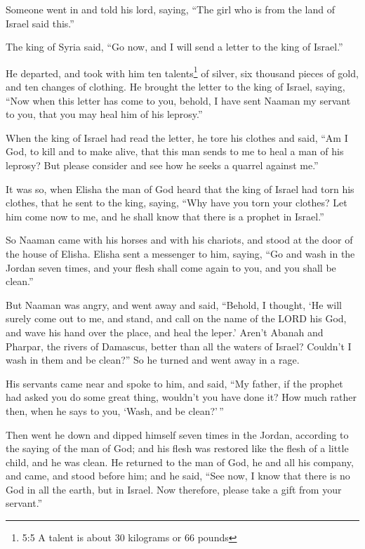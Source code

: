  Someone went in and told his lord, saying, ``The girl who
is from the land of Israel said this.''

 The king of Syria said, ``Go now, and I will send a letter
to the king of Israel.''

He departed, and took with him ten talents\footnote{5:5 A talent is
  about 30 kilograms or 66 pounds} of silver, six thousand pieces of
gold, and ten changes of clothing.  He brought the letter to
the king of Israel, saying, ``Now when this letter has come to you,
behold, I have sent Naaman my servant to you, that you may heal him of
his leprosy.''

 When the king of Israel had read the letter, he tore his
clothes and said, ``Am I God, to kill and to make alive, that this man
sends to me to heal a man of his leprosy? But please consider and see
how he seeks a quarrel against me.''

 It was so, when Elisha the man of God heard that the king
of Israel had torn his clothes, that he sent to the king, saying, ``Why
have you torn your clothes? Let him come now to me, and he shall know
that there is a prophet in Israel.''

 So Naaman came with his horses and with his chariots, and
stood at the door of the house of Elisha.  Elisha sent a
messenger to him, saying, ``Go and wash in the Jordan seven times, and
your flesh shall come again to you, and you shall be clean.''

 But Naaman was angry, and went away and said, ``Behold, I
thought, `He will surely come out to me, and stand, and call on the name
of the LORD his God, and wave his hand over the place, and heal the
leper.'  Aren't Abanah and Pharpar, the rivers of Damascus,
better than all the waters of Israel? Couldn't I wash in them and be
clean?'' So he turned and went away in a rage.

 His servants came near and spoke to him, and said, ``My
father, if the prophet had asked you do some great thing, wouldn't you
have done it? How much rather then, when he says to you, `Wash, and be
clean?'\,''

 Then went he down and dipped himself seven times in the
Jordan, according to the saying of the man of God; and his flesh was
restored like the flesh of a little child, and he was clean.
 He returned to the man of God, he and all his company, and
came, and stood before him; and he said, ``See now, I know that there is
no God in all the earth, but in Israel. Now therefore, please take a
gift from your servant.''

